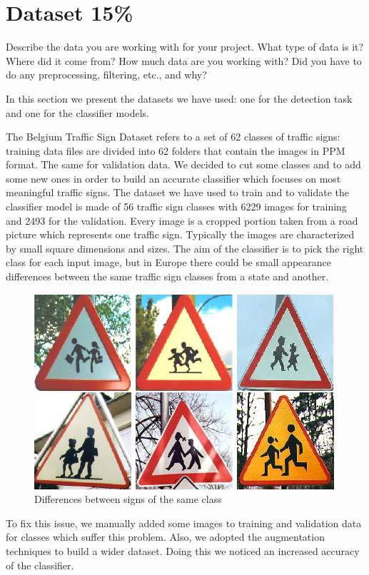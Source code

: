 \section{Dataset 15\%}
Describe the data you are working with for your project. What type of data is it? Where did it come from? How much data are you working with? Did you have to do any preprocessing, filtering, etc., and why?

In this section we present the datasets we have used: one for the detection task and one for the classifier models. 



The Belgium Traffic Sign Dataset refers to a set of 62 classes of traffic signs: training data files are divided into 62 folders that contain the images in PPM format. The same for validation data. We decided to cut some classes and to add some new ones in order to build an accurate classifier which focuses on most meaningful traffic signs. The dataset we have used to train and to validate the classifier model is made of 56 traffic sign classes with 6229 images for training and 2493 for the validation. Every image is a cropped portion taken from a road picture which represents one traffic sign. Typically the images are characterized by small square dimensions and sizes. The aim of the classifier is to pick the right class for each input image, but in Europe there could be small appearance differences between the same traffic sign classes from a state and another. 
\begin{figure}{}
	\centering
	\includegraphics[width=0.6\linewidth]{Img/differences.png}
	\caption{Differences between signs of the same class}\label{}
\end{figure}

To fix this issue, we manually added some images to training and validation data for classes which suffer this problem. Also, we adopted the augmentation techniques to build a wider dataset. Doing this we noticed an increased accuracy of the classifier. 